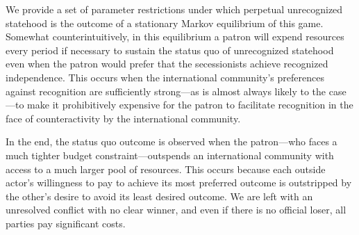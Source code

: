 \documentclass[11pt,letterpaper, notitlepage]{article}
\begin{document}
We provide a set of parameter restrictions under which perpetual unrecognized statehood is the outcome of a stationary Markov equilibrium of this game. %
Somewhat counterintuitively, in this equilibrium a patron will expend resources every period if necessary to sustain the status quo of unrecognized statehood even when the patron would prefer that the secessionists achieve recognized independence. This occurs when the international community's preferences against recognition are sufficiently strong---as is almost always likely to the case---to make it prohibitively expensive for the patron to facilitate recognition in the face of counteractivity by the international community. 

In the end, the status quo outcome is observed when the patron---who faces a much tighter budget constraint---outspends an international community with access to a much larger pool of resources. This occurs because each outside actor's willingness to pay to achieve its most preferred outcome is outstripped by the other's desire to avoid its least desired outcome. We are left with an unresolved conflict with no clear winner, and even if there is no official loser, all parties pay significant costs.
\end{document}
